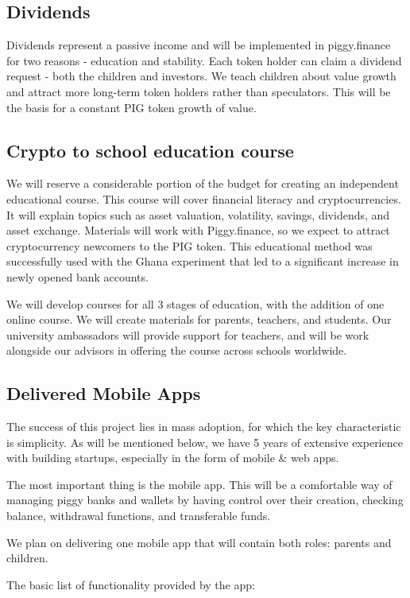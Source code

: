 \documentclass[english]{article}
\begin{document}
\subsection{Dividends}
Dividends represent a passive income and will be implemented in piggy.finance for two reasons - education and stability. Each token holder can claim a dividend request - both the children and investors. We teach children about value growth and attract more long-term token holders rather than speculators. This will be the basis for a constant PIG token growth of value.

\subsection{Crypto to school education course}
We will reserve a considerable portion of the budget for creating an independent educational course. This course will cover financial literacy and cryptocurrencies. It will explain topics such as asset valuation, volatility, savings, dividends, and asset exchange. Materials will work with Piggy.finance, so we expect to attract cryptocurrency newcomers to the PIG token. This educational method was successfully used with the Ghana experiment that led to a significant increase in newly opened bank accounts.

We will develop courses for all 3 stages of education, with the addition of one online course. We will create materials for parents, teachers, and students. Our university ambassadors will provide support for teachers, and will be work alongside our advisors in offering the course across schools worldwide.

\subsection{Delivered Mobile Apps}
The success of this project lies in mass adoption, for which the key characteristic is simplicity. As will be mentioned below, we have 5 years of extensive experience with building startups, especially in the form of mobile & web apps. 

The most important thing is the mobile app. This will be a comfortable way of managing piggy banks and wallets by having control over their creation, checking balance, withdrawal functions, and transferable funds.

We plan on delivering one mobile app that will contain both roles: parents and children.

The basic list of functionality provided by the app: 
\end{document}
